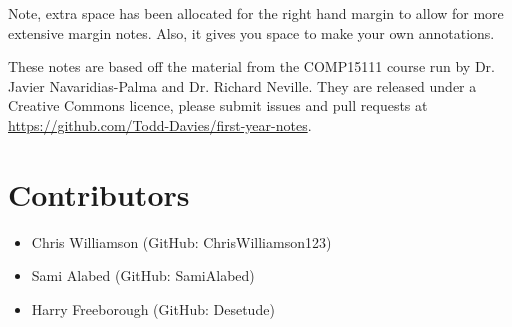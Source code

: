 \documentclass{article}
\begin{document}


\rhead{\Title}
\chead{}

\maketitle

{\small Note, extra space has been allocated for the right hand margin to allow
for more extensive margin notes. Also, it gives you space to make your own
annotations.}

{\small These notes are based off the material from the COMP15111 course run by 
Dr. Javier Navaridias-Palma and Dr. Richard Neville. They are released
under a Creative Commons licence, please submit issues and pull requests at
\url{https://github.com/Todd-Davies/first-year-notes}.}

\section*{Contributors}

\begin{itemize}
  \item Chris Williamson (GitHub: ChrisWilliamson123)
  \item Sami Alabed (GitHub: SamiAlabed)
  \item Harry Freeborough (GitHub: Desetude)
\end{itemize}

\tableofcontents
\newpage


\end{document}
